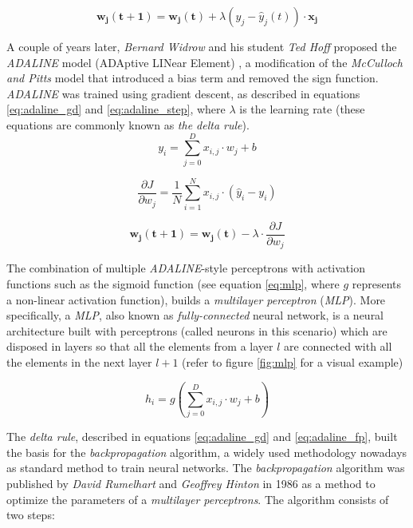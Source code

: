 \begin{equation}
\label{eq:rosenblatt}
\mathbf{w_j(t+1)} = \mathbf{w_j(t)} + \lambda (y_j-\hat{y}_j(t))\cdot \mathbf{x_j}
\end{equation}

 A couple of years later, \textit{Bernard Widrow} and his student \textit{Ted Hoff} proposed the \textit{ADALINE} model (ADAptive LINear Element) \autocite{widrow1960}, a modification of the \textit{McCulloch and Pitts} model that introduced a bias term and removed the sign function. \textit{ADALINE} was trained using gradient descent, as described in equations \ref{eq:adaline_gd} and \ref{eq:adaline_step}, where $\lambda$ is the learning rate (these equations are commonly known as \textit{the delta rule}).
\begin{equation}
\label{eq:adaline_fp}
y_i = \sum_{j=0}^{D} x_{i,j} \cdot w_{j} + b
\end{equation}

\begin{equation}
\label{eq:adaline_gd}
\frac{\partial J}{\partial{w_j}} = \frac{1}{N} \sum_{i=1}^{N} x_{i,j} \cdot(\hat{y}_i - y_i)
\end{equation}

\begin{equation}
\label{eq:adaline_step}
\mathbf{w_j(t+1)} = \mathbf{w_j(t)} - \lambda \cdot \frac{\partial J}{\partial {w_j}}
\end{equation}


 The combination of multiple \textit{ADALINE}-style perceptrons with activation functions such as the sigmoid function (see equation \ref{eq:mlp}, where $g$ represents a non-linear activation function), builds a \textit{multilayer perceptron} (\textit{MLP}). More specifically, a \textit{MLP}, also known as \textit{fully-connected} neural network, is a neural architecture built with perceptrons (called neurons in this scenario) which are disposed in layers so that all the elements from a layer $l$ are connected with all the elements in the next layer $l+1$ (refer to figure \ref{fig:mlp} for a visual example)


 \begin{equation}
 \label{eq:mlp}
 h_i = g\left(\sum_{j=0}^{D} x_{i,j} \cdot w_{j} + b\right)
 \end{equation}

 The \textit{delta rule}, described in equations \ref{eq:adaline_gd} and \ref{eq:adaline_fp}, built the basis for the \textit{backpropagation} algorithm, a widely used methodology nowadays as standard method to train neural networks. The \textit{backpropagation} algorithm \autocite{hinton1986} was published by \textit{David Rumelhart} and \textit{Geoffrey Hinton} in 1986 as a method to optimize the parameters of a \textit{multilayer perceptrons}. The algorithm consists of two steps:

